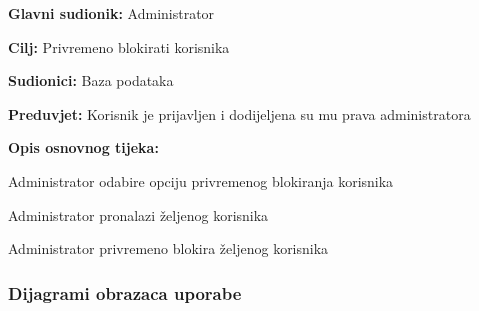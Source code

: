 					\noindent {}
					\begin{packed_item}
						
						\item \textbf{Glavni sudionik: }Administrator
						\item  \textbf{Cilj:} Privremeno blokirati korisnika
						\item  \textbf{Sudionici:} Baza podataka
						\item  \textbf{Preduvjet:} Korisnik je prijavljen i dodijeljena su mu prava administratora
						\item  \textbf{Opis osnovnog tijeka:}
						
						\item[] \begin{packed_enum}
							
							\item Administrator odabire opciju privremenog blokiranja korisnika
							\item Administrator pronalazi željenog korisnika
							\item Administrator privremeno blokira željenog korisnika
						\end{packed_enum}
					\end{packed_item}
					
				\eject
					
				\subsubsection{Dijagrami obrazaca uporabe}
					
